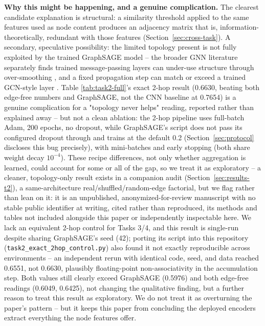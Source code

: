 \textbf{Why this might be happening, and a genuine complication.} The clearest candidate
explanation is structural: a similarity threshold applied to the same features used as node
content produces an adjacency matrix that is, information-theoretically, redundant with those
features (Section~\ref{sec:cross-task}). A secondary, speculative possibility: the limited
topology present is not fully exploited by the trained GraphSAGE model -- the broader GNN
literature separately finds trained message-passing layers can under-use structure through
over-smoothing \cite{li2018oversmoothing}, and a fixed propagation step can match or exceed a
trained GCN-style layer \cite{wu2019sgc}. Table \ref{tab:task2-full}'s exact 2-hop result
(0.6630, beating both edge-free numbers and GraphSAGE, not the CNN baseline at 0.7654) is a
genuine complication for a "topology never helps" reading, reported rather than explained
away -- but not a clean ablation: the 2-hop pipeline uses full-batch Adam, 200 epochs, no
dropout, while GraphSAGE's script does not pass its configured dropout through and trains at
the default 0.2 (Section~\ref{sec:protocol} discloses this bug precisely), with mini-batches
and early stopping (both share weight decay $10^{-4}$). These recipe differences, not only
whether aggregation is learned, could account for some or all of the gap, so we treat it as
exploratory -- a cleaner, topology-only result exists in a companion audit
\cite{tismir_audit} (Section~\ref{sec:results-t2}), a same-architecture
real/shuffled/random-edge factorial, but we flag rather than lean on it: it is an
unpublished, anonymized-for-review manuscript with no stable public identifier at writing,
cited rather than reproduced, its methods and tables not included alongside this paper or
independently inspectable here. We lack an equivalent 2-hop control for Tasks 3/4, and this
result is single-run despite sharing GraphSAGE's seed (42); porting its script into this
repository (\texttt{task2\_exact\_2hop\_control.py}) also found it not exactly reproducible
across environments -- an independent rerun with identical code, seed, and data reached
0.6551, not 0.6630, plausibly floating-point non-associativity in the accumulation step. Both
values still clearly exceed GraphSAGE (0.5976) and both edge-free readings (0.6049, 0.6425),
not changing the qualitative finding, but a further reason to treat this result as
exploratory. We do not treat it as overturning the paper's pattern -- but it keeps this paper
from concluding the deployed encoders extract everything the node features offer.

